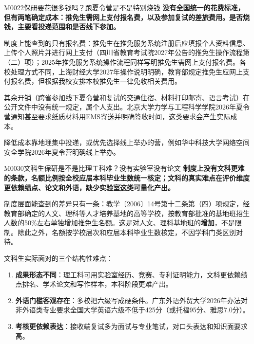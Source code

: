 \begin{qa}{M0022}{保研要花很多钱吗？跑夏令营是不是特别烧钱}
\textbf{没有全国统一的花费标准，但有两笔确定成本：推免生需网上支付报名费，以及参加复试的差旅费用。是否烧钱，主要看投递范围和是否线下参加。}

制度上能查到的只有报名费：推免生在推免服务系统注册后应填报个人资料信息、上传个人照片并进行网上支付（四川省教育考试院2027年公告的推免生操作流程第（二）项）；2025年推免服务系统操作流程同样写明推免生需网上支付报名费。各校处理方式不同，上海财经大学2027年操作说明明确，教育部规定推免生应网上支付报名费，但根据我校安排本校推免生一律免收相关费用。

其余开销（跨省参加线下夏令营和复试的交通住宿、材料打印邮寄、语言考试）在公开文件中没有统一规定，属个人支出。北京大学力学与工程科学学院2026年夏令营通知甚至要求纸质材料用EMS寄送并明确签收时间，这类要求会产生实际成本。

降低成本靠地理集中投递，或优先选择线上举办的营，例如华中科技大学网络空间安全学院2026年夏令营明确线上举办。
\end{qa}

\begin{qa}{M0030}{文科生保研是不是比理工科难？没有实验室没有论文}
\textbf{制度上没有文科更难的条款，名额比例按全校应届本科毕业生数统一核定；文科的真实难点在评价维度更依赖绩点、论文和外语，缺少实验室这类可量化产出。}

制度层面能查到的差异只有一条：教学〔2006〕14号第十二条第（四）项规定，经教育部确定的人文、理科等人才培养基地的高等学校，按教育部批准的基地班招生人数的50\%左右单独增加推免生名额。这是对人文、理科基地班的\textbf{增加}，不是限制。除此之外，名额按学校层次和应届本科毕业生数核定，不因学科门类区别对待。

文科生实际面对的三个结构性难点：

\begin{enumerate}
  \item \textbf{成果形态不同}：理工科可用实验室经历、竞赛、专利证明能力，文科更依赖绩点排名、学术论文和写作样本，本科阶段更难产出。
  \item \textbf{外语门槛客观存在}：多校把六级写成硬条件。广东外语外贸大学2026年办法对非外语类专业要求全国大学英语六级不低于425分（或托福95分、雅思7.0分）。
  \item \textbf{考核更依赖表达}：接收端复试多为面试与专业笔试，对口头表达和知识面要求高。
\end{enumerate}
\end{qa}

